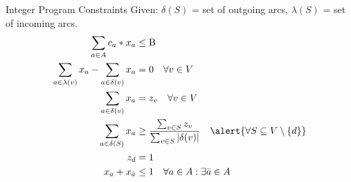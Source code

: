 \documentclass{beamer}
\newcommand{\set}[1]{\ensuremath{\{{#1}\}}} %
\newcommand{\sse}{\subseteq} %
\begin{document}
\begin{frame}{Integer Program Constraints}
Given: $\delta(S)$ = set of outgoing arcs, $\lambda(S)$ = set of incoming arcs.
\begin{align}
    \sum_{a \in A}{c_a * x_a} &\leq \text{B}\\
    \sum_{a \in \lambda(v)}{x_a}  -\sum_{a \in \delta(v)}{x_a} &= 0 \quad \forall v \in V\\
    \sum_{a \in \delta(v)}{x_a} &= z_v \quad\forall v \in V\\
    \sum_{a \in \delta(S)}{x_a} &\geq \frac{\sum_{v \in S}{z_v}}{\sum_{v \in S}{|\delta(v)|}} \quad \alert{\forall S \sse V \setminus \set{d}}\\
    z_d &= 1\\
    x_a + x_{\bar{a}} &\leq 1 \quad \forall a \in A: \exists\bar{a} \in A
\end{align} 
\end{frame}
\end{document}
